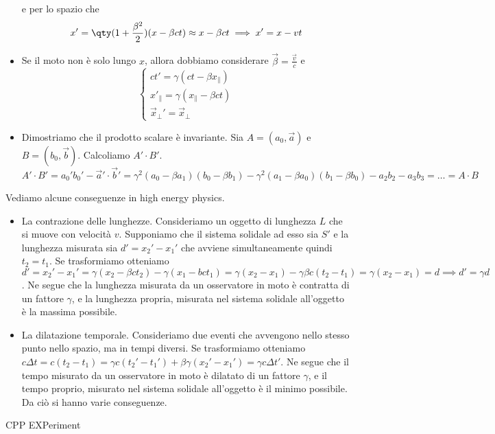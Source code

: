 \begin{itemize}
    e per lo spazio che 
    \begin{equation*}
        x'=\qty(1+\frac{\beta^2}2)(x-\beta ct)\approx x-\beta ct\implies x'= x - vt
    \end{equation*}
    \item Se il moto non è solo lungo $x$, allora dobbiamo considerare $\vec\beta=\frac{\vec v} c$ e 
    \begin{equation*}
        \begin{cases}
            ct'=\gamma(ct-\beta x_\parallel) \\
            x'_\parallel=\gamma(x_\parallel-\beta ct)\\
            \vec x_\perp'=\vec x_\perp
        \end{cases}
    \end{equation*}
    \item Dimostriamo che il prodotto scalare è invariante. Sia $A=(a_0,\vec a)$ e $B=(b_0,\vec b)$. Calcoliamo $A'\cdot B'$.
    \begin{equation*}
        A'\cdot B'=a_0'b_0'-\vec a'\cdot\vec b'=\gamma^2(a_0-\beta a_1)(b_0-\beta b_1)-\gamma^2(a_1-\beta a_0)(b_1-\beta b_0)-a_2b_2-a_3b_3=\dots=A\cdot B
    \end{equation*}
\end{itemize}
Vediamo alcune conseguenze in high energy physics.
\begin{itemize}
    \item La contrazione delle lunghezze. Consideriamo un oggetto di lunghezza $L$ che si muove con velocità $v$. Supponiamo che il sistema solidale ad esso sia $S'$ e la lunghezza misurata sia $d'=x_2'-x_1'$ che avviene simultaneamente quindi $t_2=t_1$. Se trasformiamo otteniamo $d'=x_2'-x_1'=\gamma(x_2-\beta ct_2)-\gamma(x_1-bct_1)=\gamma(x_2-x_1)-\gamma\beta c(t_2-t_1)=\gamma(x_2-x_1)=d\implies d'=\gamma d$. Ne segue che la lunghezza misurata da un osservatore in moto è contratta di un fattore $\gamma$, e la lunghezza propria, misurata nel sistema solidale all'oggetto è la massima possibile.
    \item La dilatazione temporale. Consideriamo due eventi che avvengono nello stesso punto nello spazio, ma in tempi diversi. Se trasformiamo otteniamo $c\Delta t=c(t_2-t_1)=\gamma c(t_2'-t_1')+\beta \gamma (x_2'-x_1')=\gamma c\Delta t'$. Ne segue che il tempo misurato da un osservatore in moto è dilatato di un fattore $\gamma$, e il tempo proprio, misurato nel sistema solidale all'oggetto è il minimo possibile. Da ciò si hanno varie conseguenze.
\end{itemize}
CPP EXPeriment